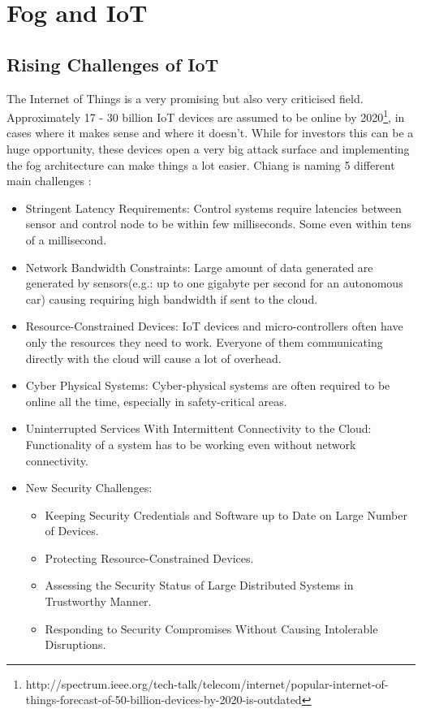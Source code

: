 \section{Fog and IoT}

\subsection{Rising Challenges of IoT}
The Internet of Things is a very promising but also very criticised field.
Approximately 17 - 30 billion IoT devices are assumed to be online by 2020\footnote{http://spectrum.ieee.org/tech-talk/telecom/internet/popular-internet-of-things-forecast-of-50-billion-devices-by-2020-is-outdated}, in cases where it makes sense and where it doesn't. While for investors this can be a huge opportunity, these devices open a very big attack surface and implementing the fog architecture can make things a lot easier. Chiang is naming 5 different main challenges \cite[p. 855 ff.]{DBLP:journals/iotj/ChiangZ16}:

\begin{itemize}
	\item [A] Stringent Latency Requirements: Control systems require latencies between sensor and control node to be within few milliseconds. Some even within tens of a millisecond.
	\item [B] Network Bandwidth Constraints: Large amount of data generated are generated by sensors(e.g.: up to one gigabyte per second for an autonomous car) causing requiring high bandwidth if sent to the cloud.
	\item [C] Resource-Constrained Devices: IoT devices and micro-controllers often have only the resources they need to work. Everyone of them communicating directly with the cloud will cause a lot of overhead.
	\item [D] Cyber Physical Systems: Cyber-physical systems are often required to be online all the time, especially in safety-critical areas.
	\item [E] Uninterrupted Services With Intermittent Connectivity to the Cloud: Functionality of a system has to be working even without network connectivity.
    \item [F] New Security Challenges:
	\begin{itemize}
		\item[1)] Keeping Security Credentials and Software up to Date on Large Number of Devices.
		\item[2)] Protecting Resource-Constrained Devices.
		\item[3)] Assessing the Security Status of Large Distributed Systems in Trustworthy Manner.
		\item[4)] Responding to Security Compromises Without Causing Intolerable Disruptions.
	\end{itemize}
\end{itemize}

